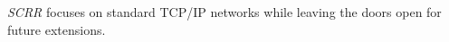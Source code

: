 \textit{SCRR} focuses on standard TCP/IP networks while leaving the doors open for future extensions.

